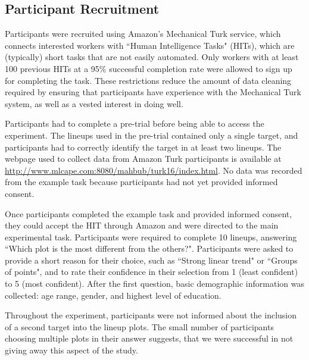 \documentclass[12pt]{article}\usepackage[]{graphicx}\usepackage[]{color}
\begin{document}

\subsection{Participant Recruitment}
Participants were recruited using Amazon's Mechanical Turk service\citep{amazon}, which connects interested workers with ``Human Intelligence Tasks" (HITs), which are (typically) short tasks that are not easily automated. Only workers with at least 100 previous HITs at a 95\% successful completion rate were allowed to sign up for completing the task. These restrictions reduce the amount of data cleaning required by ensuring that participants have experience with the Mechanical Turk system, as well as a vested interest in doing well. 



Participants had to complete a pre-trial before being able to access the experiment. 
The lineups used in the pre-trial contained only a single target,%
and participants had to correctly identify the target in at least two lineups. %
The webpage used to collect data from Amazon Turk participants is available at \url{http://www.mlcape.com:8080/mahbub/turk16/index.html}. No data was recorded from the example task because participants had not yet provided informed consent. 

Once participants completed the example task and provided informed consent, they could accept the HIT through Amazon and were directed to the main experimental task. 
Participants were required to complete 10 lineups, answering ``Which plot is the most different from the others?". Participants were asked to provide a short reason for their choice, such as ``Strong linear trend" or ``Groups of points", and to rate their confidence in their selection from 1 (least confident) to 5 (most confident). 
After the first question, basic demographic information was collected: age range, gender, and highest level of education. 

Throughout the experiment, participants were not informed about the inclusion of a second target into the lineup plots.  The small number of participants choosing multiple plots in their answer suggests, that we were successful in not giving away this aspect of the study.
\end{document}
